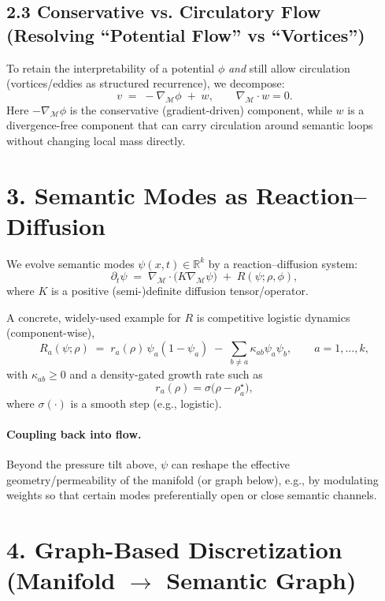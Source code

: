 \documentclass[11pt]{article}
\begin{document}
\subsection*{2.3 Conservative vs. Circulatory Flow (Resolving ``Potential Flow'' vs ``Vortices'')}
To retain the interpretability of a potential $\phi$ \emph{and} still allow circulation (vortices/eddies as structured recurrence),
we decompose:
\begin{equation}
v \;=\; -\nabla_{\mathcal{M}}\phi \;+\; w,
\qquad \nabla_{\mathcal{M}}\cdot w = 0.
\end{equation}
Here $-\nabla_{\mathcal{M}}\phi$ is the conservative (gradient-driven) component, while $w$ is a divergence-free component that can carry
circulation around semantic loops without changing local mass directly.

\section*{3. Semantic Modes as Reaction--Diffusion}
We evolve semantic modes $\psi(x,t)\in\mathbb{R}^k$ by a reaction--diffusion system:
\begin{equation}
\partial_t \psi \;=\; \nabla_{\mathcal{M}}\cdot\big(K\nabla_{\mathcal{M}}\psi\big)\;+\;R(\psi;\rho,\phi),
\end{equation}
where $K$ is a positive (semi-)definite diffusion tensor/operator.

A concrete, widely-used example for $R$ is competitive logistic dynamics (component-wise),
\begin{equation}
R_a(\psi;\rho) \;=\; r_a(\rho)\,\psi_a(1-\psi_a)\;-\;\sum_{b\ne a}\kappa_{ab}\psi_a\psi_b,
\qquad a=1,\dots,k,
\end{equation}
with $\kappa_{ab}\ge 0$ and a density-gated growth rate such as
\begin{equation}
r_a(\rho)=\sigma\big(\rho-\rho_a^\star\big),
\end{equation}
where $\sigma(\cdot)$ is a smooth step (e.g., logistic).

\paragraph{Coupling back into flow.}
Beyond the pressure tilt above, $\psi$ can reshape the effective geometry/permeability of the manifold (or graph below),
e.g., by modulating weights so that certain modes preferentially open or close semantic channels.

\section*{4. Graph-Based Discretization (Manifold $\to$ Semantic Graph)}
\end{document}
